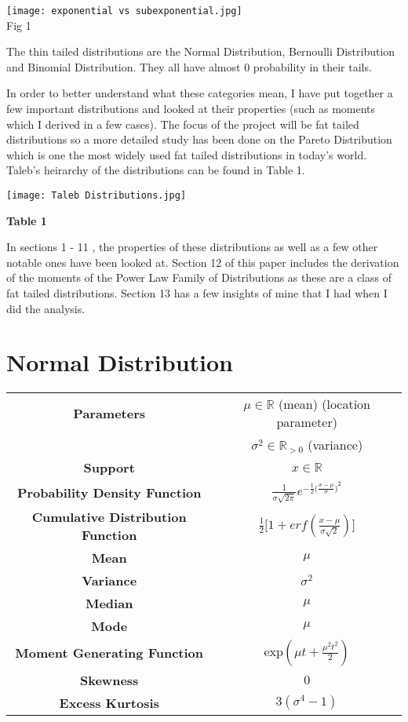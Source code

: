 \documentclass[14pt, a4paper]{article}
\theoremstyle{definition}
\newcommand{\R}{\mathbb{R}}
\begin{document}
\begin{center}
    \texttt{[image: exponential vs subexponential.jpg]}
    \\ Fig 1
\end{center}

The thin tailed distributions are the Normal Distribution, Bernoulli Distribution and Binomial Distribution. They all have almost 0 probability in their tails.

\newpage
In order to better understand what these categories mean, I have put together a few important distributions and looked at their properties (such as moments which I derived in a few cases). The focus of the project will be fat tailed distributions so a more detailed study has been done on the Pareto Distribution which is one the most widely used fat tailed distributions in today's world.  Taleb's heirarchy of the distributions can be found in Table 1. 

\texttt{[image: Taleb Distributions.jpg]}
\\ \centerline{\textbf{Table 1}}

 In sections 1 - 11 , the properties of these distributions as well as a few other notable ones have been looked at. Section 12 of this paper includes the derivation of the moments of the Power Law Family of Distributions as these are a class of fat tailed distributions. Section 13 has a few insights of mine that I had when I did the analysis.
 
 
\section{Normal Distribution}
\begin{center}
    \begin{tabular}{|c|c|}  %
\hline
 \textbf{Parameters }& $\mu \in \R$ (mean) (location parameter) \\ & $\sigma^2 \in \R_{>0}$ (variance) \\
 \hline
 \textbf{Support} & $x \in \R$ \\
 \hline
 \textbf{Probability Density Function} & $\frac{1}{\sigma \sqrt{2 \pi } } e^{ - \frac{1}{2} \big( \frac{x-\mu}{\sigma} \big) ^2 } $  \\
 \hline
 \textbf{Cumulative Distribution Function} & $\frac{1}{2} \Bigg[1 + erf(\frac{x - \mu}{\sigma \sqrt{2}}  ) \Bigg]$ \\
 \hline
 \textbf{Mean} & $\mu$ \\ 
 \hline
 \textbf{Variance} & $\sigma^2$ \\
 \hline
 \textbf{Median} & $\mu$ \\ 
 \hline
 \textbf{Mode} & $\mu$ \\
 \hline
 \textbf{Moment Generating Function} & exp$(\mu t + \frac{\mu^2 t^2}{2})$ \\
 \hline
 \textbf{Skewness} & $0$  \\
 \hline
 \textbf{Excess Kurtosis} & $3(\sigma^4 -1)$ \\
 \hline
       
  \end{tabular}
\end{center}
\end{document}

